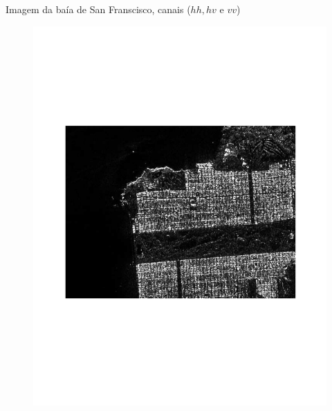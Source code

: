 \documentclass[10pt]{beamer}
\begin{document}

\begin{frame}{Imagem da baía de San Franscisco, canais ($hh, hv$ e $vv$)}
	\begin{figure}[hbt]
  \includegraphics[width=\linewidth]{sf_hh.pdf}
\endminipage
{}

\end{figure}
\end{frame}
\end{document}
